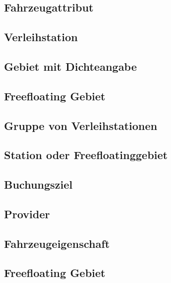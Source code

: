 \subsection*{Fahrzeugattribut}


\subsection*{Verleihstation}



\subsection*{Gebiet mit Dichteangabe}


\subsection*{Freefloating Gebiet}


\subsection*{Gruppe von Verleihstationen}


\subsection*{Station oder Freefloatinggebiet}


\subsection*{Buchungsziel}



\subsection*{Provider}



\subsection*{Fahrzeugeigenschaft}


\subsection*{Freefloating Gebiet}


